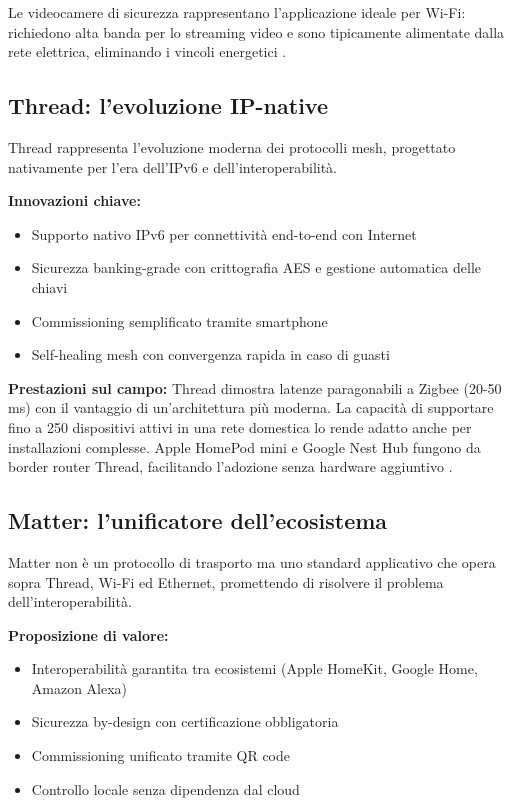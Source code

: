 Le videocamere di sicurezza rappresentano l'applicazione ideale per Wi-Fi: richiedono alta banda per lo streaming video e sono tipicamente alimentate dalla rete elettrica, eliminando i vincoli energetici \cite{WiFiVsIoT}.

\subsection{Thread: l'evoluzione IP-native}

Thread rappresenta l'evoluzione moderna dei protocolli mesh, progettato nativamente per l'era dell'IPv6 e dell'interoperabilità.

\textbf{Innovazioni chiave:}
\begin{itemize}
    \item Supporto nativo IPv6 per connettività end-to-end con Internet
    \item Sicurezza banking-grade con crittografia AES e gestione automatica delle chiavi
    \item Commissioning semplificato tramite smartphone
    \item Self-healing mesh con convergenza rapida in caso di guasti
\end{itemize}

\textbf{Prestazioni sul campo:}
Thread dimostra latenze paragonabili a Zigbee (20-50 ms) con il vantaggio di un'architettura più moderna. La capacità di supportare fino a 250 dispositivi attivi in una rete domestica lo rende adatto anche per installazioni complesse. Apple HomePod mini e Google Nest Hub fungono da border router Thread, facilitando l'adozione senza hardware aggiuntivo \cite{ThreadProtocol}.

\subsection{Matter: l'unificatore dell'ecosistema}

Matter non è un protocollo di trasporto ma uno standard applicativo che opera sopra Thread, Wi-Fi ed Ethernet, promettendo di risolvere il problema dell'interoperabilità.

\textbf{Proposizione di valore:}
\begin{itemize}
    \item Interoperabilità garantita tra ecosistemi (Apple HomeKit, Google Home, Amazon Alexa)
    \item Sicurezza by-design con certificazione obbligatoria
    \item Commissioning unificato tramite QR code
    \item Controllo locale senza dipendenza dal cloud
\end{itemize}

